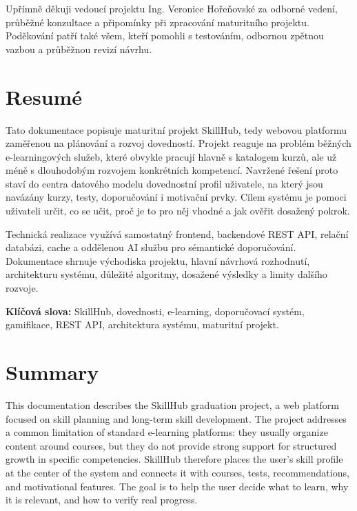 \documentclass[12pt,a4paper]{report}
\begin{document}
\clearpage
\thispagestyle{empty}
Upřímně děkuji vedoucí projektu Ing. Veronice Hořeňovské za odborné vedení, průběžné konzultace a připomínky při zpracování maturitního projektu. Poděkování patří také všem, kteří pomohli s testováním, odbornou zpětnou vazbou a průběžnou revizí návrhu.

\clearpage
\chapter*{Resumé}
Tato dokumentace popisuje maturitní projekt SkillHub, tedy webovou platformu zaměřenou na plánování a rozvoj dovedností. Projekt reaguje na problém běžných e-learningových služeb, které obvykle pracují hlavně s katalogem kurzů, ale už méně s dlouhodobým rozvojem konkrétních kompetencí. Navržené řešení proto staví do centra datového modelu dovednostní profil uživatele, na který jsou navázány kurzy, testy, doporučování i motivační prvky. Cílem systému je pomoci uživateli určit, co se učit, proč je to pro něj vhodné a jak ověřit dosažený pokrok.

Technická realizace využívá samostatný frontend, backendové REST API, relační databázi, cache a oddělenou AI službu pro sémantické doporučování. Dokumentace shrnuje východiska projektu, hlavní návrhová rozhodnutí, architekturu systému, důležité algoritmy, dosažené výsledky a limity dalšího rozvoje.

\vspace{0.7cm}
\noindent\textbf{Klíčová slova:} SkillHub, dovednosti, e-learning, doporučovací systém, gamifikace, REST API, architektura systému, maturitní projekt.

\clearpage
\chapter*{Summary}
This documentation describes the SkillHub graduation project, a web platform focused on skill planning and long-term skill development. The project addresses a common limitation of standard e-learning platforms: they usually organize content around courses, but they do not provide strong support for structured growth in specific competencies. SkillHub therefore places the user's skill profile at the center of the system and connects it with courses, tests, recommendations, and motivational features. The goal is to help the user decide what to learn, why it is relevant, and how to verify real progress.
\end{document}
